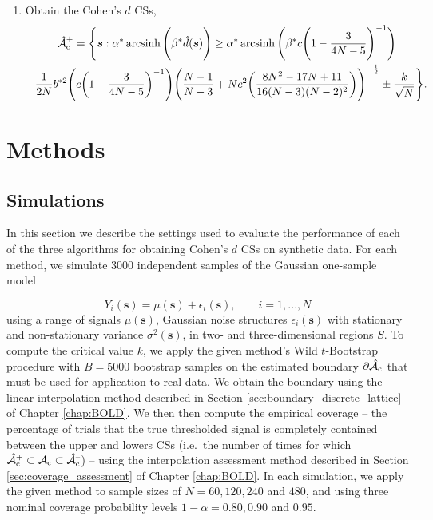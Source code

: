 \begin{algorithm}
\begin{enumerate}
\item Obtain the Cohen's $d$ CSs,
\begin{multline}
\label{eq:transformed_cohens_CSs_again}
    \operatorname{\hat{\mathcal{A}}_{c}^\pm} = \Bigg\{\bm{s} : \alpha^{*} \operatorname{arcsinh}\Bigg(\beta^{*} \hat{d}(\bm{s}) \Bigg) \geq \alpha^{*} \operatorname{arcsinh}\Bigg(\beta^{*} c \Bigg(1 - \frac{3}{4N -5}\Bigg)^{-1} \Bigg) \\
    - \frac{1}{2N}b^{*2}\Bigg(c \bigg(1 - \frac{3}{4N - 5}\bigg)^{-1} \Bigg)\Bigg(\frac{N-1}{N-3} + N c^{2} \bigg(\frac{8N^{2} - 17N + 11}{16(N-3)(N-2)^{2}} \bigg)\Bigg)^{-\frac{1}{2}} \pm \frac{k}{\sqrt{N}} \Bigg\}. 
\end{multline}
\end{enumerate}
\end{algorithm}

\section{Methods}
\subsection{Simulations}
\label{sec:cohen_simulations}
In this section we describe the settings used to evaluate the performance of each of the three algorithms for obtaining Cohen's $d$ CSs on synthetic data. For each method, we simulate 3000 independent samples of the Gaussian one-sample model 

$$Y_{i}(\bm{s}) = \mu(\bm{s}) + \epsilon_{i}(\bm{s}), \qquad i = 1, ..., N$$
using a range of signals $\mu(\bm{s})$, Gaussian noise structures $\epsilon_{i}(\bm{s})$ with stationary and non-stationary variance $\sigma^{2}(\bm{s})$, in two- and three-dimensional regions $S$. To compute the critical value $k$, we apply the given method's Wild $t$-Bootstrap procedure with $B = 5000$ bootstrap samples on the estimated boundary $\operatorname{\partial\hat{\mathcal{A}}_{c}}$ that must be used for application to real data. We obtain the boundary using the linear interpolation method described in Section \ref{sec:boundary_discrete_lattice} of Chapter \ref{chap:BOLD}. We then then compute the empirical coverage -- the percentage of trials that the true thresholded signal is completely contained between the upper and lowers CSs \Big(i.e.\ the number of times for which $\operatorname{\hat{\mathcal{A}}_{c}^+} \subset \operatorname{\mathcal{A}_{c}} \subset \operatorname{\hat{\mathcal{A}}_{c}^{\textrm{--}}}$\Big) -- using the interpolation assessment method described in Section \ref{sec:coverage_assessment} of Chapter \ref{chap:BOLD}. In each simulation, we apply the given method to sample sizes of $N = 60, 120, 240$ and $480$, and using three nominal coverage probability levels $1 - \alpha = 0.80, 0.90$ and $0.95$. 


